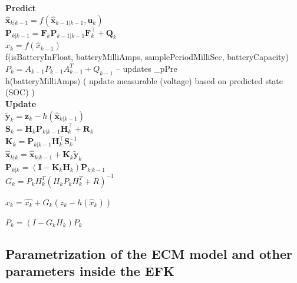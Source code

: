 \textbf{Predict} \\
${\displaystyle {\hat {\boldsymbol {x}}}_{k|k-1}=f({\hat {\boldsymbol {x}}}_{k-1|k-1},{\boldsymbol {u}}_{k})} $ \\
${\displaystyle {\boldsymbol {P}}_{k|k-1}={{\boldsymbol {F}}_{k}}{\boldsymbol {P}}_{k-1|k-1}{{\boldsymbol {F}}_{k}^{\top }}+{\boldsymbol {Q}}_{k}}$ \\

$\hat{x}_k = f(\hat{x}_{k-1})$ \\
    
f(isBatteryInFloat, batteryMilliAmps, samplePeriodMilliSec, batteryCapacity) \\

$P_k = A_{k-1} P_{k-1} A^T_{k-1} + Q_{k-1}$ -- updates _pPre \\
    

h(batteryMilliAmps)  ( update measurable (voltage) based on predicted state (SOC) ) \\

\textbf{Update} \\
${\tilde  {{\boldsymbol  {y}}}}_{{k}}={\boldsymbol  {z}}_{{k}}-h({\hat  {{\boldsymbol  {x}}}}_{{k|k-1}})$ \\
${\boldsymbol  {S}}_{{k}}={{{\boldsymbol  {H}}_{{k}}}}{\boldsymbol  {P}}_{{k|k-1}}{{{\boldsymbol  {H}}_{{k}}^{\top }}}+{\boldsymbol  {R}}_{{k}}$ \\
${\boldsymbol  {K}}_{{k}}={\boldsymbol  {P}}_{{k|k-1}}{{{\boldsymbol  {H}}_{{k}}^{\top }}}{\boldsymbol  {S}}_{{k}}^{{-1}}$ \\
${\hat  {{\boldsymbol  {x}}}}_{{k|k}}={\hat  {{\boldsymbol  {x}}}}_{{k|k-1}}+{\boldsymbol  {K}}_{{k}}{\tilde  {{\boldsymbol  {y}}}}_{{k}}$ \\
${\boldsymbol  {P}}_{{k|k}}=({\boldsymbol  {I}}-{\boldsymbol  {K}}_{{k}}{{{\boldsymbol  {H}}_{{k}}}}){\boldsymbol  {P}}_{{k|k-1}}$ \\




$G_k = P_k H^T_k (H_k P_k H^T_k + R)^{-1}$

 $\hat{x}_k = \hat{x_k} + G_k(z_k - h(\hat{x}_k))$
 

$P_k = (I - G_k H_k) P_k$

 



\subsection{Parametrization of the ECM model and other parameters inside the EFK}
\label{Parametrization}

